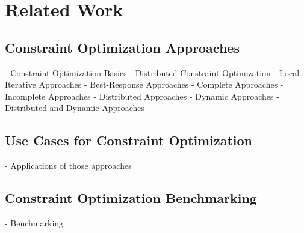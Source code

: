 \chapter{Related Work}
\section{Constraint Optimization Approaches}
- Constraint Optimization Basics
- Distributed Constraint Optimization
- Local Iterative Approaches
- Best-Response Approaches
- Complete Approaches
- Incomplete Approaches
- Distributed Approaches
- Dynamic Approaches
- Distributed and  Dynamic Approaches
\section{Use Cases for Constraint Optimization}
- Applications of those approaches
\section{Constraint Optimization Benchmarking}
- Benchmarking